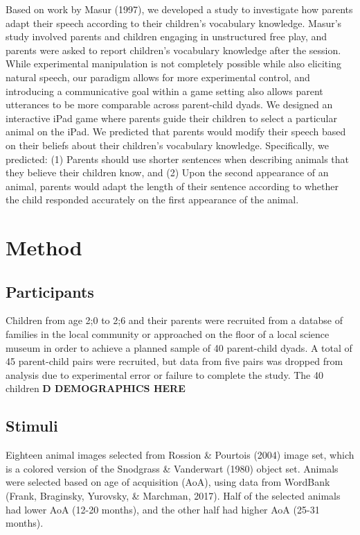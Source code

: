 \documentclass[10pt, letterpaper]{article}
\begin{document}
Based on work by Masur (1997), we developed a study to investigate how
parents adapt their speech according to their children's vocabulary
knowledge. Masur's study involved parents and children engaging in
unstructured free play, and parents were asked to report children's
vocabulary knowledge after the session. While experimental manipulation
is not completely possible while also eliciting natural speech, our
paradigm allows for more experimental control, and introducing a
communicative goal within a game setting also allows parent utterances
to be more comparable across parent-child dyads. We designed an
interactive iPad game where parents guide their children to select a
particular animal on the iPad. We predicted that parents would modify
their speech based on their beliefs about their children's vocabulary
knowledge. Specifically, we predicted: (1) Parents should use shorter
sentences when describing animals that they believe their children know,
and (2) Upon the second appearance of an animal, parents would adapt the
length of their sentence according to whether the child responded
accurately on the first appearance of the animal.

\hypertarget{method}{%
\section{Method}\label{method}}

\hypertarget{participants}{%
\subsection{Participants}\label{participants}}

Children from age 2;0 to 2;6 and their parents were recruited from a
databse of families in the local community or approached on the floor of
a local science museum in order to achieve a planned sample of 40
parent-child dyads. A total of 45 parent-child pairs were recruited, but
data from five pairs was dropped from analysis due to experimental error
or failure to complete the study. The 40 children \textbf{D DEMOGRAPHICS
HERE}

\hypertarget{stimuli}{%
\subsection{Stimuli}\label{stimuli}}

Eighteen animal images selected from Rossion \& Pourtois (2004) image
set, which is a colored version of the Snodgrass \& Vanderwart (1980)
object set. Animals were selected based on age of acquisition (AoA),
using data from WordBank (Frank, Braginsky, Yurovsky, \& Marchman,
2017). Half of the selected animals had lower AoA (12-20 months), and
the other half had higher AoA (25-31 months).
\end{document}
